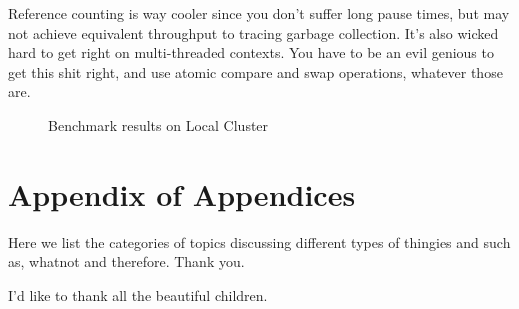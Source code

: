 \documentclass[preprint]{sigplanconf}
\begin{document}
Reference counting \cite{Collins:1960} is way cooler since you don't suffer long pause times, but 
may not achieve equivalent throughput to tracing garbage collection.  It's also wicked hard 
to get right on multi-threaded contexts.  You have to be an evil genious to get this shit right,
and use atomic compare and swap operations, whatever those are.

\begin{figure}
\normalsize %

\caption{Benchmark results on Local Cluster}
\label{fig:slot_runtime}
\end{figure}


\appendix
\section{Appendix of Appendices}

Here we list the categories of topics discussing different types of thingies 
and such as, whatnot and therefore. Thank you.

\acks

I'd like to thank all the beautiful children.




\end{document}
